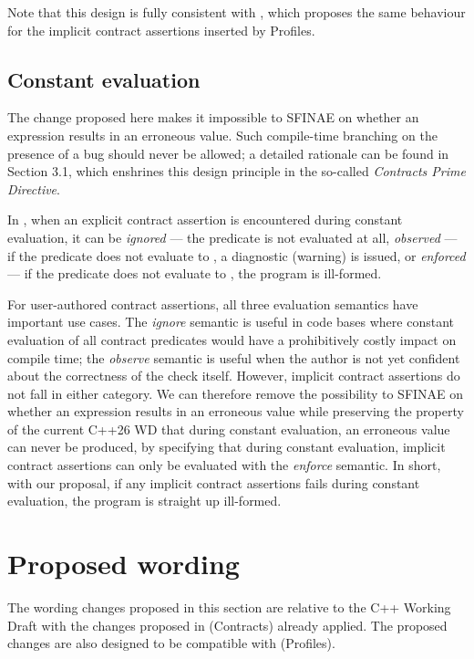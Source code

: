 Note that this design is fully consistent with \cite{P3081R1}, which proposes the same behaviour for the implicit contract assertions inserted by Profiles.

\subsection{Constant evaluation}

The change proposed here makes it impossible to SFINAE on whether an expression results in an erroneous value. Such compile-time branching on the presence of a bug should never be allowed; a detailed rationale can be found in \cite{P2900R13} Section 3.1, which enshrines this design principle in the so-called \emph{Contracts Prime Directive}.

In \cite{P2900R13}, when an explicit contract assertion is encountered during constant evaluation, it can be \emph{ignored} --- the predicate is not evaluated at all, \emph{observed} --- if the predicate does not evaluate to , a diagnostic (warning) is issued, or \emph{enforced} --- if the predicate does not evaluate to , the program is ill-formed.

For user-authored contract assertions, all three evaluation semantics have important use cases. The \emph{ignore} semantic is useful in code bases where constant evaluation of all contract predicates would have a prohibitively costly impact on compile time; the \emph{observe} semantic is useful when the author is not yet confident about the correctness of the check itself. However, implicit contract assertions do not fall in either category. We can therefore remove the possibility to SFINAE on whether an expression results in an erroneous value while preserving the property of the current C++26 WD that during constant evaluation, an erroneous value can never be produced, by specifying that during constant evaluation, implicit contract assertions can only be evaluated with the \emph{enforce} semantic. In short, with our proposal, if any implicit contract assertions fails during constant evaluation, the program is straight up ill-formed.

\section{Proposed wording}

The wording changes proposed in this section are relative to the C++ Working Draft \cite{N5001} with the changes proposed in \cite{P2900R13} (Contracts) already applied. The proposed changes are also designed to be compatible with \cite{P3081R1} (Profiles).

